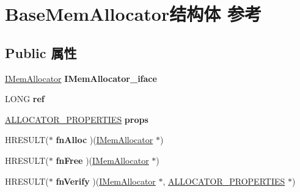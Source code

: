 \hypertarget{struct_base_mem_allocator}{}\section{Base\+Mem\+Allocator结构体 参考}
\label{struct_base_mem_allocator}
\subsection*{Public 属性}
\begin{DoxyCompactItemize}
\item 
\mbox{\label{struct_base_mem_allocator_a6db9d5233bc47e0c7ef36a099b2ec871}} 
\hyperlink{interface_i_mem_allocator}{I\+Mem\+Allocator} {\bfseries I\+Mem\+Allocator\+\_\+iface}
\item 
\mbox{\label{struct_base_mem_allocator_ae1c3bc2aed40a38ab6dd7c01664a52f7}} 
L\+O\+NG {\bfseries ref}
\item 
\mbox{\label{struct_base_mem_allocator_ab67ada429a2478bfa08e90f9086873ce}} 
\hyperlink{struct___allocator_properties}{A\+L\+L\+O\+C\+A\+T\+O\+R\+\_\+\+P\+R\+O\+P\+E\+R\+T\+I\+ES} {\bfseries props}
\item 
\mbox{\label{struct_base_mem_allocator_ad3e1725b8956d135e29a032514c39743}} 
H\+R\+E\+S\+U\+LT($\ast$ {\bfseries fn\+Alloc} )(\hyperlink{interface_i_mem_allocator}{I\+Mem\+Allocator} $\ast$)
\item 
\mbox{\label{struct_base_mem_allocator_a70e58b7687deb3de4c84ee63f52147fa}} 
H\+R\+E\+S\+U\+LT($\ast$ {\bfseries fn\+Free} )(\hyperlink{interface_i_mem_allocator}{I\+Mem\+Allocator} $\ast$)
\item 
\mbox{\label{struct_base_mem_allocator_ad2b70969521ef4a400b7a627e5caf332}} 
H\+R\+E\+S\+U\+LT($\ast$ {\bfseries fn\+Verify} )(\hyperlink{interface_i_mem_allocator}{I\+Mem\+Allocator} $\ast$, \hyperlink{struct___allocator_properties}{A\+L\+L\+O\+C\+A\+T\+O\+R\+\_\+\+P\+R\+O\+P\+E\+R\+T\+I\+ES} $\ast$)
\item 
\mbox{\label{struct_base_mem_allocator_ad4636c480e490bf3a9e4676cc4441359}} 

\end{DoxyCompactItemize}
